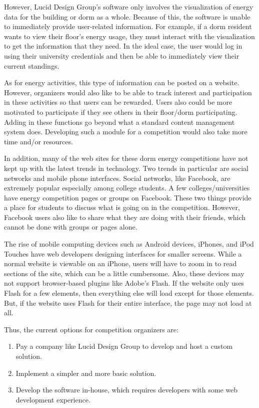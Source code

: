 However, Lucid Design Group's software only involves the visualization of energy data for the building or dorm as a whole.  Because of this, the software is unable to immediately provide user-related information.  For example, if a dorm resident wants to view their floor's energy usage, they must interact with the visualization to get the information that they need.  In the ideal case, the user would log in using their university credentials and then be able to immediately view their current standings.

As for energy activities, this type of information can be posted on a website.  However, organizers would also like to be able to track interest and participation in these activities so that users can be rewarded.  Users also could be more motivated to participate if they see others in their floor/dorm participating.  Adding in these functions go beyond what a standard content management system does.  Developing such a module for a competition would also take more time and/or resources.

In addition, many of the web sites for these dorm energy competitions have not kept up with the latest trends in technology.  Two trends in particular are social networks and mobile phone interfaces.  Social networks, like Facebook, are extremely popular especially among college students.  A few colleges/universities have energy competition pages or groups on Facebook.  These two things provide a place for students to discuss what is going on in the competition.  However, Facebook users also like to share what they are doing with their friends, which cannot be done with groups or pages alone.

The rise of mobile computing devices such as Android devices, iPhones, and iPod Touches have web developers designing interfaces for smaller screens.  While a normal website is viewable on an iPhone, users will have to zoom in to read sections of the site, which can be a little cumbersome.  Also, these devices may not support browser-based plugins like Adobe's Flash.  If the website only uses Flash for a few elements, then everything else will load except for those elements.  But, if the website uses Flash for their entire interface, the page may not load at all.

Thus, the current options for competition organizers are:

\begin{enumerate}
		\item Pay a company like Lucid Design Group to develop and host a custom solution.
		\item Implement a simpler and more basic solution.
		\item Develop the software in-house, which requires developers with some web development experience.
\end{enumerate}

